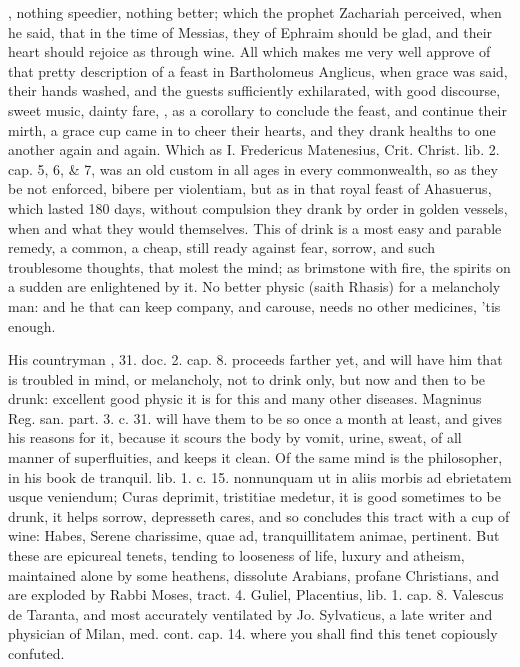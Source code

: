 , nothing
speedier, nothing better; which the prophet Zachariah perceived, when
he said, that in the time of Messias, they of Ephraim should be glad,
and their heart should rejoice as through wine. All which makes me very
well approve of that pretty description of a feast in 
Bartholomeus Anglicus, when grace was said, their hands washed, and the
guests sufficiently exhilarated, with good discourse, sweet music,
dainty fare, , as a corollary to conclude the feast, and continue their
mirth, a grace cup came in to cheer their hearts, and they drank
healths to one another again and again. Which as I. Fredericus
Matenesius, Crit. Christ. lib. 2. cap. 5, 6, \& 7, was an old custom in
all ages in every commonwealth, so as they be not enforced, bibere per
violentiam, but as in that royal feast of  Ahasuerus, which
lasted 180 days, without compulsion they drank by order in golden
vessels, when and what they would themselves. This of drink is a most
easy and parable remedy, a common, a cheap, still ready against fear,
sorrow, and such troublesome thoughts, that molest the mind; as
brimstone with fire, the spirits on a sudden are enlightened by it. No
better physic (saith Rhasis) for a melancholy man: and he that
can keep company, and carouse, needs no other medicines, 'tis enough.

His countryman \Avicenna{}, 31. doc. 2. cap. 8. proceeds farther yet, and
will have him that is troubled in mind, or melancholy, not to drink
only, but now and then to be drunk: excellent good physic it is for
this and many other diseases. Magninus Reg. san. part. 3. c. 31. will
have them to be so once a month at least, and gives his reasons for it,
because it scours the body by vomit, urine, sweat, of all manner
of superfluities, and keeps it clean. Of the same mind is \Seneca{} the
philosopher, in his book de tranquil. lib. 1. c. 15. nonnunquam ut in
aliis morbis ad ebrietatem usque veniendum; Curas deprimit, tristitiae
medetur, it is good sometimes to be drunk, it helps sorrow, depresseth
cares, and so concludes this tract with a cup of wine: Habes, Serene
charissime, quae ad, tranquillitatem animae, pertinent. But these are
epicureal tenets, tending to looseness of life, luxury and atheism,
maintained alone by some heathens, dissolute Arabians, profane
Christians, and are exploded by Rabbi Moses, tract. 4. Guliel,
Placentius, lib. 1. cap. 8. Valescus de Taranta, and most accurately
ventilated by Jo. Sylvaticus, a late writer and physician of Milan,
med. cont. cap. 14. where you shall find this tenet copiously confuted.

